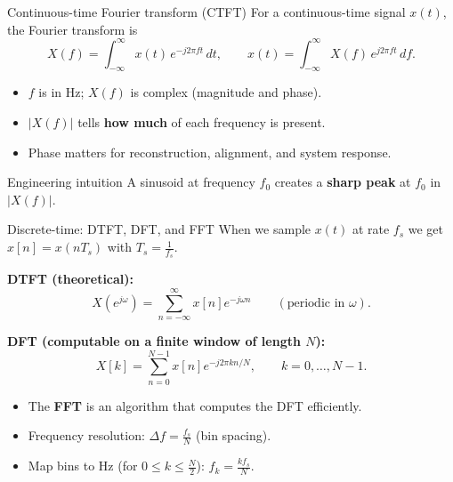 \documentclass[aspectratio=169]{beamer}
\begin{document}
\begin{frame}{Continuous-time Fourier transform (CTFT)}
\small
For a continuous-time signal $x(t)$, the Fourier transform is
\[
X(f) = \int_{-\infty}^{\infty} x(t)\,e^{-j2\pi f t}\,dt,
\qquad
x(t) = \int_{-\infty}^{\infty} X(f)\,e^{j2\pi f t}\,df.
\]

\begin{itemize}
  \item $f$ is in Hz; $X(f)$ is complex (magnitude and phase).
  \item $|X(f)|$ tells \textbf{how much} of each frequency is present.
  \item Phase matters for reconstruction, alignment, and system response.
\end{itemize}

\begin{block}{Engineering intuition}
A sinusoid at frequency $f_0$ creates a \textbf{sharp peak} at $f_0$ in $|X(f)|$.
\end{block}
\end{frame}

\begin{frame}{Discrete-time: DTFT, DFT, and FFT}
\small
When we sample $x(t)$ at rate $f_s$ we get $x[n]=x(nT_s)$ with $T_s=\tfrac{1}{f_s}$.

\vspace{0.3em}
\textbf{DTFT (theoretical):}
\[
X\!\left(e^{j\omega}\right) = \sum_{n=-\infty}^{\infty} x[n] e^{-j\omega n}
\qquad (\text{periodic in }\omega).
\]

\vspace{0.3em}
\textbf{DFT (computable on a finite window of length $N$):}
\[
X[k] = \sum_{n=0}^{N-1} x[n] e^{-j2\pi kn/N},\qquad k=0,\dots,N-1.
\]

\begin{itemize}
  \item The \textbf{FFT} is an algorithm that computes the DFT efficiently.
  \item Frequency resolution: $\Delta f = \tfrac{f_s}{N}$ (bin spacing).
  \item Map bins to Hz (for $0\le k\le \tfrac{N}{2}$): $f_k = \tfrac{k f_s}{N}$.
\end{itemize}
\end{frame}
\end{document}
